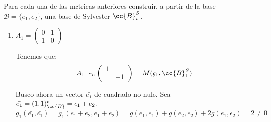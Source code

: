 \begin{ejercicio}
    Para cada una de las métricas anteriores construir, a partir de la base $\mathcal{B}=\{e_1,e_2\}$, una base de Sylvester $\cc{B}_{i}^S$.
    \begin{enumerate}
        \item $A_1=\left(\begin{array}{cc}
            0 & 1 \\
            1 & 0
        \end{array} \right)$
        
        Tenemos que:
        \begin{equation*}
            A_1 \sim_c \left(\begin{array}{cc}
                1 &  \\
                & -1
            \end{array} \right) = M(g_1, \cc{B}_{1}^S)
        \end{equation*}
        
        Busco ahora un vector $\bar{e_1}$ de cuadrado no nulo. Sea $\bar{e_1} = (1,1)^t_{\cc{B}} = e_1 + e_2$.
        \begin{equation*}
            g_1(\bar{e_1}, \bar{e_1}) = g_1(e_1+e_2, e_1+e_2) = g(e_1,e_1) + g(e_2,e_2) + 2g(e_1, e_2) = 2 \neq 0
        \end{equation*}


\end{enumerate}
\end{ejercicio}
